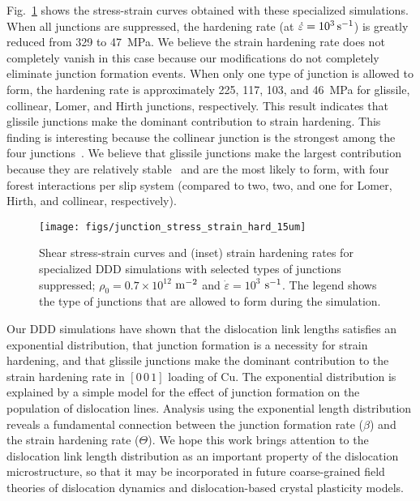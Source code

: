 \documentclass[%
reprint,
 amsmath,amssymb,
 aps,
superscriptaddress,
]{revtex4-1}
\begin{document}
Fig.~\ref{fig:junctionhardening} shows the stress-strain curves obtained with
these specialized simulations. When all junctions are suppressed, the hardening
rate (at $\dot{\varepsilon} = 10^{3}\,{\rm s}^{-1}$) is greatly reduced from 329
to 47~MPa. 
%
We believe the strain hardening rate does not completely vanish in this case 
because our modifications do not completely eliminate junction formation 
events.
When only one type of junction is allowed to form, the hardening rate
is approximately {225, 117, 103, and 46~MPa} for
glissile, collinear, Lomer, and Hirth junctions, respectively.
%
This result indicates that glissile junctions make the dominant contribution to 
strain hardening.  This finding is interesting because the collinear junction is 
the strongest among the four junctions~\cite{Madec2003}.
%
%
We believe that glissile junctions make the largest contribution because they
are relatively stable~\cite{Kubin2003} and are the most likely to form, with four forest
interactions per slip system (compared to two, two, and one for Lomer, Hirth,
and collinear, respectively).

\begin{figure}
\center
%
\texttt{[image: figs/junction\_stress\_strain\_hard\_15um]}
%
\caption{\label{fig:junctionhardening} Shear stress-strain curves and (inset)
strain hardening rates for specialized DDD simulations with selected types of
junctions suppressed; $\rho_0 = 0.7 \times 10^{12}$ $\rm m^{-2}$ and
$\dot{\varepsilon} = 10^3$ $\rm s^{-1}$. 
%
The legend shows the type of junctions that are allowed to form during the
simulation. }
%
\end{figure}


%
Our DDD simulations have shown that the dislocation link lengths satisfies an
exponential distribution, that junction formation is a necessity for strain
hardening, and that glissile junctions make the dominant contribution to the
strain hardening rate in $[0\,0\,1]$ loading of Cu.
%
The exponential distribution is explained by a simple model for the effect
of  junction formation on the population of dislocation lines.
%
Analysis using the exponential length distribution reveals a
fundamental connection between the junction formation rate ($\beta$) and the
strain hardening rate ($\Theta$).
%
We hope this work brings attention to the dislocation link length distribution
as an important property of the dislocation microstructure, so that it may be
incorporated in future coarse-grained field theories of dislocation dynamics and
dislocation-based crystal plasticity models.
\end{document}
